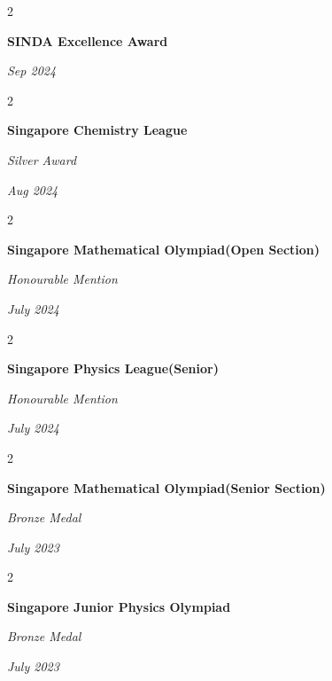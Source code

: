 \documentclass[10pt, letterpaper]{article}
\newenvironment{twocolentry}[2][]{
    \onecolentry
    \def\secondColumn{#2}
    \setcolumnwidth{\fill, 4.5 cm}
    \begin{paracol}{2}
}{
    \switchcolumn \raggedleft \secondColumn
    \end{paracol}
    \endonecolentry
} %
\begin{document}
        \begin{twocolentry}{
            
            
        \textit{Sep 2024}}
            \textbf{SINDA Excellence Award}

        \end{twocolentry}

  \begin{twocolentry}{
            
            
        \textit{Aug 2024}}
            \textbf{Singapore Chemistry League}

            \textit{Silver Award}

        \end{twocolentry}



 \begin{twocolentry}{
            
            
        \textit{July 2024 }}
            \textbf{Singapore Mathematical Olympiad(Open Section)}

            \textit{Honourable Mention}

        \end{twocolentry}

\begin{twocolentry}{
            
            
        \textit{July 2024 }}
            \textbf{Singapore Physics League(Senior)}

            \textit{Honourable Mention}

        \end{twocolentry}

        \begin{twocolentry}{
            
            
        \textit{July 2023 }}
            \textbf{Singapore Mathematical Olympiad(Senior Section)}

            \textit{Bronze Medal}

        \end{twocolentry}

 \begin{twocolentry}{
            
            
        \textit{July 2023 }}
            \textbf{Singapore Junior Physics Olympiad}

            \textit{Bronze Medal}

        \end{twocolentry}
\end{document}
